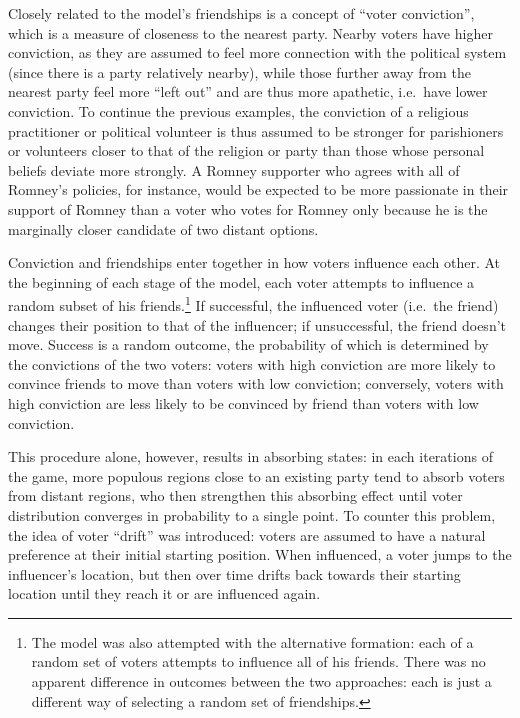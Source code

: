 \documentclass[12pt]{article}
\numberwithin{equation}{subsection}
\begin{document}
Closely related to the model's friendships is a concept of ``voter conviction'', which is a measure
of closeness to the nearest party.  Nearby voters have higher conviction, as they are assumed to
feel more connection with the political system (since there is a party relatively nearby), while
those further away from the nearest party feel more ``left out'' and are thus more apathetic, i.e.\
have lower conviction.  To continue the previous examples, the conviction of a religious
practitioner or political volunteer is thus assumed to be stronger for parishioners or volunteers
closer to that of the religion or party than those whose personal beliefs deviate more strongly.  A
Romney supporter who agrees with all of Romney's policies, for instance, would be expected to be
more passionate in their support of Romney than a voter who votes for Romney only because he is the
marginally closer candidate of two distant options.

Conviction and friendships enter together in how voters influence each other.  At the beginning of
each stage of the model, each voter attempts to influence a random subset of his friends.\footnote{
    The model was also attempted with the alternative formation: each of a random set of voters
    attempts to influence all of his friends.  There was no apparent difference in outcomes between
    the two approaches: each is just a different way of selecting a random set of friendships.
}  If successful, the influenced voter (i.e.\ the friend) changes their position to that of the
influencer; if unsuccessful, the friend doesn't move.  Success is a random outcome, the probability
of which is determined by the convictions of the two voters: voters with high conviction are more
likely to convince friends to move than voters with low conviction; conversely, voters with high
conviction are less likely to be convinced by friend than voters with low conviction.

This procedure alone, however, results in absorbing states: in each iterations of the game, more
populous regions close to an existing party tend to absorb voters from distant regions, who then
strengthen this absorbing effect until voter distribution converges in probability to a single
point.  To counter this problem, the idea of voter ``drift'' was introduced: voters are assumed to have a
natural preference at their initial starting position.  When influenced, a voter jumps to the influencer's
location, but then over time drifts back towards their starting location until they reach it or are
influenced again.
\end{document}
